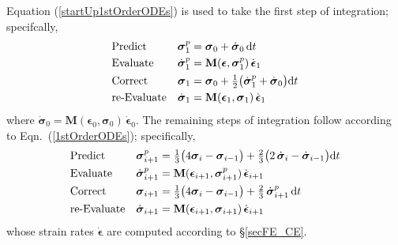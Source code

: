 Equation (\ref{startUp1stOrderODEs}) is used to take the first step of integration; specifcally, 
\begin{subequations}
    \notag
    \begin{align}
    \mbox{} & \text{Predict} & 
    \boldsymbol{\sigma}_1^p & = \boldsymbol{\sigma}_0 + \dot{\boldsymbol{\sigma}}_0 \, \mathrm{d}t \\
    \mbox{} & \text{Evaluate} & 
    \dot{\boldsymbol{\sigma}}^p_1 & = \mathbf{M} ( \boldsymbol{\epsilon} , \boldsymbol{\sigma}_1^p ) \, \dot{\boldsymbol{\epsilon}}_1 \\
    \mbox{} & \text{Correct} &
    \boldsymbol{\sigma}_1 & = \boldsymbol{\sigma}_0 + \tfrac{1}{2} 
    \bigl( \dot{\boldsymbol{\sigma}}_1^p + 
    \dot{\boldsymbol{\sigma}}_0 \bigr) \mathrm{d} t \\
    \mbox{} & \text{re-Evaluate} & 
    \dot{\boldsymbol{\sigma}}_1 & = \mathbf{M} ( \boldsymbol{\epsilon}_1 , \boldsymbol{\sigma}_1 ) \, \dot{\boldsymbol{\epsilon}}_1
    \end{align}
\end{subequations}
where $\dot{\boldsymbol{\sigma}}_0 = \mathbf{M} ( \boldsymbol{\epsilon}_0 , \boldsymbol{\sigma}_0 ) \, \dot{\boldsymbol{\epsilon}}_0$.  The remaining steps of integration follow according to Eqn.~(\ref{1stOrderODEs}); specifically,
\begin{subequations}
    \notag
    \begin{align}
    \mbox{} & \text{Predict} & 
    \boldsymbol{\sigma}_{i+1}^p & = \tfrac{1}{3} 
    \bigl( 4 \boldsymbol{\sigma}_i - \boldsymbol{\sigma}_{i-1} \bigr) + 
    \tfrac{2}{3} \bigl( 2 \, \dot{\boldsymbol{\sigma}}_i - 
    \dot{\boldsymbol{\sigma}}_{i-1} \bigr) \mathrm{d} t \\
    \mbox{} & \text{Evaluate} & 
    \dot{\boldsymbol{\sigma}}^p_{i+1} & = \mathbf{M} ( \boldsymbol{\epsilon}_{i+1} , \boldsymbol{\sigma}_{i+1}^p ) \, \dot{\boldsymbol{\epsilon}}_{i+1} \\
    \mbox{} & \text{Correct} &
    \boldsymbol{\sigma}_{i+1} & = \tfrac{1}{3} 
    \bigl( 4 \boldsymbol{\sigma}_i - \boldsymbol{\sigma}_{i-1} \bigr) + 
    \tfrac{2}{3} \, \dot{\boldsymbol{\sigma}}^{p}_{i+1} \, \mathrm{d}t \\
    \mbox{} & \text{re-Evaluate} & 
    \dot{\boldsymbol{\sigma}}_{i+1} & = \mathbf{M} ( \boldsymbol{\epsilon}_{i+1} , 
    \boldsymbol{\sigma}_{i+1} ) \, \dot{\boldsymbol{\epsilon}}_{i+1}
    \end{align}
\end{subequations} 
whose strain rates $\dot{\boldsymbol{\epsilon}}$ are computed according to \S\ref{secFE_CE}.


